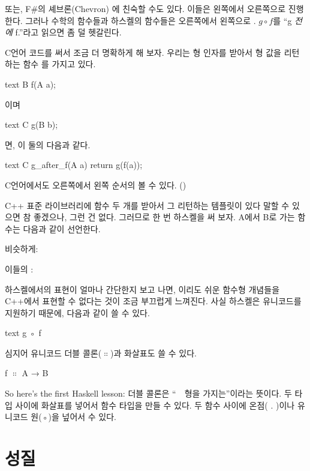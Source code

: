 또는, F\#의 셰브론(Chevron) \code{>>}에 친숙할 수도 있다. 이들은 왼쪽에서 오른쪽으로 진행한다.
그러나 수학의 함수들과 하스켈의 함수들은 오른쪽에서 왼쪽으로 .
$g \circ f$를 ``g \emph{전에} f.''라고 읽으면 좀 덜 헷갈린다.

C언어 코드를 써서 조금 더 명확하게 해 보자. 
우리는 형 인자를 받아서 형 값을 리턴하는 함수 를 가지고 있다.

\begin{snip}{text}
B f(A a);
\end{snip}
이며

\begin{snip}{text}
C g(B b);
\end{snip}
면, 이 둘의  다음과 같다.

\begin{snip}{text}
C g_after_f(A a)
{
    return g(f(a));
}
\end{snip}
C언어에서도 오른쪽에서 왼쪽 순서의  볼 수 있다. ()

C++ 표준 라이브러리에 함수 두 개를 받아서 그  리턴하는 템플릿이 있다 말할 수 있으면 참 좋겠으나, 그런 건 없다.
그러므로 한 번 하스켈을 써 보자. A에서 B로 가는 함수는 다음과 같이 선언한다.

비슷하게:

이들의 :

하스켈에서의 표현이 얼마나 간단한지 보고 나면, 이리도 쉬운 함수형 개념들을 C++에서 표현할 수 없다는 것이 조금 부끄럽게 느껴진다.
사실 하스켈은 유니코드를 지원하기 때문에,  다음과 같이 쓸 수 있다.
\begin{snip}{text}
g ◦ f
\end{snip}

심지어 유니코드 더블 콜론($\ensuremath{\Colon}$)과 화살표도 쓸 수 있다.
\begin{snipv}
f \ensuremath{\Colon} A → B
\end{snipv}
So here's the first Haskell lesson: 더블 콜론은 ``~~형을 가지는''이라는 뜻이다.
두 타입 사이에 화살표를 넣어서 함수 타입을 만들 수 있다.
두 함수 사이에 온점( . )이나 유니코드 원(◦)을 넢어서  수 있다.

\section{ 성질}

